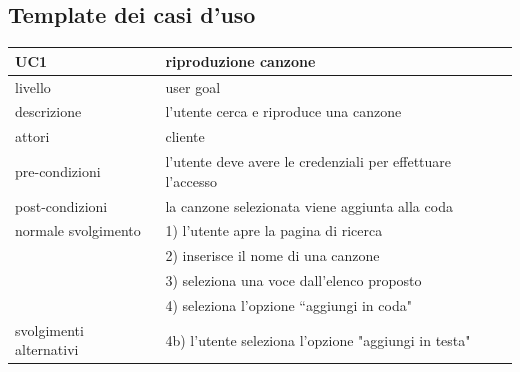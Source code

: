 \documentclass{article}
\begin{document}
  \subsection{Template dei casi d'uso}

  \begin{center}
    \begin{tabular}{|l|l|}
      \hline
      \textbf{UC1}            & \textbf{riproduzione canzone}                               \\
      \hline
      livello                 & user goal                                                   \\
      \hline
      descrizione             & l'utente cerca e riproduce una canzone                      \\
      \hline
      attori                  & cliente                                                     \\
      \hline
      pre-condizioni          & l'utente deve avere le credenziali per effettuare l'accesso \\
      \hline
      post-condizioni         & la canzone selezionata viene aggiunta alla coda             \\
      \hline
      normale svolgimento     & 1) l'utente apre la pagina di ricerca                       \\
      & 2) inserisce il nome di una canzone                         \\
      & 3) seleziona una voce dall'elenco proposto                  \\
      & 4) seleziona l'opzione ``aggiungi in coda"

      \\
      \hline
      svolgimenti alternativi & 4b) l'utente seleziona l'opzione "aggiungi in testa"        \\
      \hline

    \end{tabular}

    \vspace{40pt}


\end{center}
\end{document}
